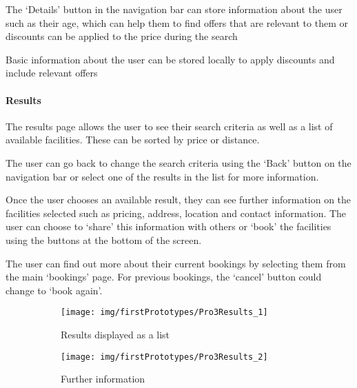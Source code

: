The `Details' button in the navigation bar can store information about the user
such as their age, which can help them to find offers that are relevant to them
or discounts can be applied to the price during the search

Basic information about the user can be stored locally to apply discounts and
include relevant offers

\paragraph{Results}

The results page allows the user to see their search criteria as well as a list
of available facilities. These can be sorted by price or distance.

The user can go back to change the search criteria using the `Back' button on
the navigation bar or select one of the results in the list for more
information.

Once the user chooses an available result, they can see further information on
the facilities selected such as pricing, address, location and contact
information. The user can choose to `share' this information with others or
`book' the facilities using the buttons at the bottom of the screen.

The user can find out more about their current bookings by selecting them from
the main `bookings' page. For previous bookings, the `cancel' button could
change to `book again'.

\begin{figure}[htbp]
	\centering
	\begin{subfigure}[b]{0.45\textwidth}
		\texttt{[image: img/firstPrototypes/Pro3Results\_1]}
		\caption{Results displayed as a list}\label{fig:Pro3Results_1}
	\end{subfigure}%
	\qquad
	\begin{subfigure}[b]{0.45\textwidth}
		\texttt{[image: img/firstPrototypes/Pro3Results\_2]}
		\caption{Further information}\label{fig:Pro3Results_2}
	\end{subfigure}
	\caption{}\label{fig:Pro3Results}
\end{figure}

